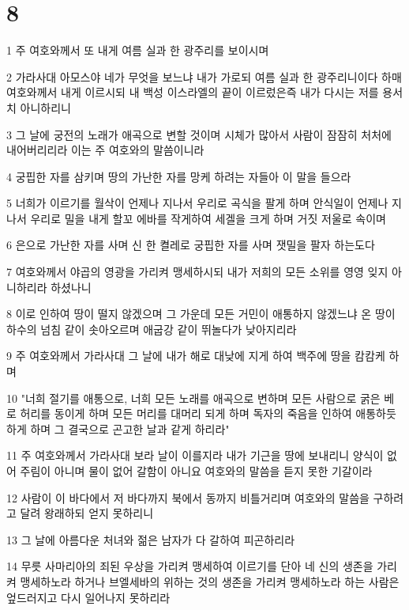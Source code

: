 \chapter{8}

\par 1 주 여호와께서 또 내게 여름 실과 한 광주리를 보이시며
\par 2 가라사대 아모스야 네가 무엇을 보느냐 내가 가로되 여름 실과 한 광주리니이다 하매 여호와께서 내게 이르시되 내 백성 이스라엘의 끝이 이르렀은즉 내가 다시는 저를 용서치 아니하리니
\par 3 그 날에 궁전의 노래가 애곡으로 변할 것이며 시체가 많아서 사람이 잠잠히 처처에 내어버리리라 이는 주 여호와의 말씀이니라
\par 4 궁핍한 자를 삼키며 땅의 가난한 자를 망케 하려는 자들아 이 말을 들으라
\par 5 너희가 이르기를 월삭이 언제나 지나서 우리로 곡식을 팔게 하며 안식일이 언제나 지나서 우리로 밀을 내게 할꼬 에바를 작게하여 세겔을 크게 하며 거짓 저울로 속이며
\par 6 은으로 가난한 자를 사며 신 한 켤레로 궁핍한 자를 사며 잿밀을 팔자 하는도다
\par 7 여호와께서 야곱의 영광을 가리켜 맹세하시되 내가 저희의 모든 소위를 영영 잊지 아니하리라 하셨나니
\par 8 이로 인하여 땅이 떨지 않겠으며 그 가운데 모든 거민이 애통하지 않겠느냐 온 땅이 하수의 넘침 같이 솟아오르며 애굽강 같이 뛰놀다가 낮아지리라
\par 9 주 여호와께서 가라사대 그 날에 내가 해로 대낮에 지게 하여 백주에 땅을 캄캄케 하며
\par 10 "너희 절기를 애통으로, 너희 모든 노래를 애곡으로 변하며 모든 사람으로 굵은 베로 허리를 동이게 하며 모든 머리를 대머리 되게 하며 독자의 죽음을 인하여 애통하듯 하게 하며 그 결국으로 곤고한 날과 같게 하리라"
\par 11 주 여호와께서 가라사대 보라 날이 이를지라 내가 기근을 땅에 보내리니 양식이 없어 주림이 아니며 물이 없어 갈함이 아니요 여호와의 말씀을 듣지 못한 기갈이라
\par 12 사람이 이 바다에서 저 바다까지 북에서 동까지 비틀거리며 여호와의 말씀을 구하려고 달려 왕래하되 얻지 못하리니
\par 13 그 날에 아름다운 처녀와 젊은 남자가 다 갈하여 피곤하리라
\par 14 무릇 사마리아의 죄된 우상을 가리켜 맹세하여 이르기를 단아 네 신의 생존을 가리켜 맹세하노라 하거나 브엘세바의 위하는 것의 생존을 가리켜 맹세하노라 하는 사람은 엎드러지고 다시 일어나지 못하리라

